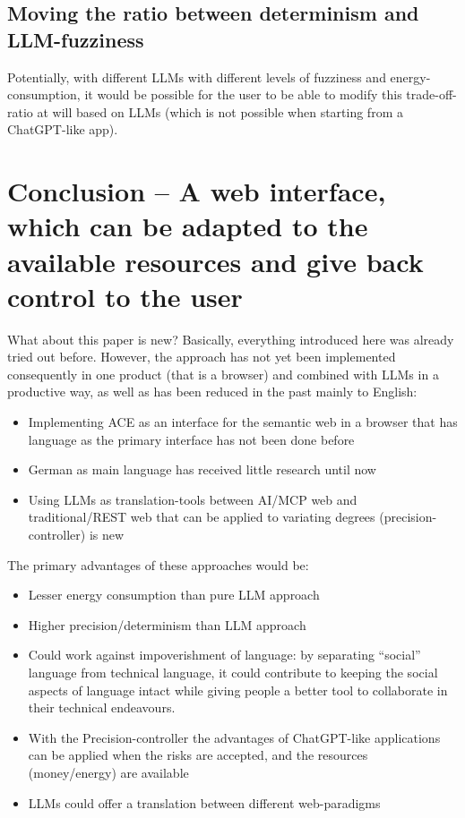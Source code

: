 \documentclass[12pt,a4paper]{article}
\begin{document}
\newpage

\subsection{Moving the ratio between determinism and LLM-fuzziness}

Potentially, with different LLMs with different levels of fuzziness and energy-consumption, it would be possible for the user to be able to modify this trade-off-ratio at will based on LLMs (which is not possible when starting from a ChatGPT-like app).

\section{Conclusion -- A web interface, which can be adapted to the available resources and give back control to the user}

What about this paper is new? Basically, everything introduced here was already tried out before. However, the approach has not yet been implemented consequently in one product (that is a browser) and combined with LLMs in a productive way, as well as has been reduced in the past mainly to English:
\begin{itemize}
    \item Implementing ACE as an interface for the semantic web in a browser that has language as the primary interface has not been done before
    \item German as main language has received little research until now
    \item Using LLMs as translation-tools between AI/MCP web and traditional/REST web that can be applied to variating degrees (precision-controller) is new
\end{itemize}

The primary advantages of these approaches would be:
\begin{itemize}
    \item Lesser energy consumption than pure LLM approach
    \item Higher precision/determinism than LLM approach
    \item Could work against impoverishment of language: by separating ``social'' language from technical language, it could contribute to keeping the social aspects of language intact while giving people a better tool to collaborate in their technical endeavours.
    \item With the Precision-controller the advantages of ChatGPT-like applications can be applied when the risks are accepted, and the resources (money/energy) are available
    \item LLMs could offer a translation between different web-paradigms
\end{itemize}
\end{document}
